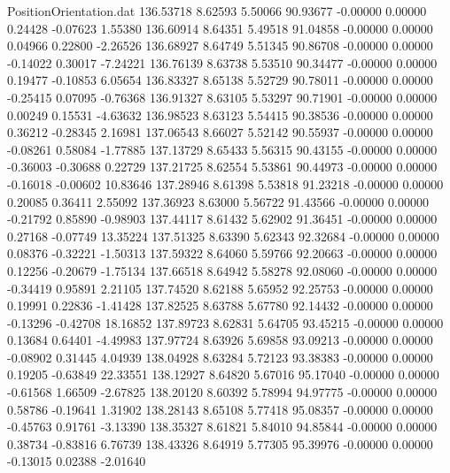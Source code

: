 \begin{filecontents}{PositionOrientation.dat}
 136.53718    8.62593    5.50066    90.93677   -0.00000    0.00000    0.24428   -0.07623    1.55380
 136.60914    8.64351    5.49518    91.04858   -0.00000    0.00000    0.04966    0.22800   -2.26526
 136.68927    8.64749    5.51345    90.86708   -0.00000    0.00000   -0.14022    0.30017   -7.24221
 136.76139    8.63738    5.53510    90.34477   -0.00000    0.00000    0.19477   -0.10853    6.05654
 136.83327    8.65138    5.52729    90.78011   -0.00000    0.00000   -0.25415    0.07095   -0.76368
 136.91327    8.63105    5.53297    90.71901   -0.00000    0.00000    0.00249    0.15531   -4.63632
 136.98523    8.63123    5.54415    90.38536   -0.00000    0.00000    0.36212   -0.28345    2.16981
 137.06543    8.66027    5.52142    90.55937   -0.00000    0.00000   -0.08261    0.58084   -1.77885
 137.13729    8.65433    5.56315    90.43155   -0.00000    0.00000   -0.36003   -0.30688    0.22729
 137.21725    8.62554    5.53861    90.44973   -0.00000    0.00000   -0.16018   -0.00602   10.83646
 137.28946    8.61398    5.53818    91.23218   -0.00000    0.00000    0.20085    0.36411    2.55092
 137.36923    8.63000    5.56722    91.43566   -0.00000    0.00000   -0.21792    0.85890   -0.98903
 137.44117    8.61432    5.62902    91.36451   -0.00000    0.00000    0.27168   -0.07749   13.35224
 137.51325    8.63390    5.62343    92.32684   -0.00000    0.00000    0.08376   -0.32221   -1.50313
 137.59322    8.64060    5.59766    92.20663   -0.00000    0.00000    0.12256   -0.20679   -1.75134
 137.66518    8.64942    5.58278    92.08060   -0.00000    0.00000   -0.34419    0.95891    2.21105
 137.74520    8.62188    5.65952    92.25753   -0.00000    0.00000    0.19991    0.22836   -1.41428
 137.82525    8.63788    5.67780    92.14432   -0.00000    0.00000   -0.13296   -0.42708   18.16852
 137.89723    8.62831    5.64705    93.45215   -0.00000    0.00000    0.13684    0.64401   -4.49983
 137.97724    8.63926    5.69858    93.09213   -0.00000    0.00000   -0.08902    0.31445    4.04939
 138.04928    8.63284    5.72123    93.38383   -0.00000    0.00000    0.19205   -0.63849   22.33551
 138.12927    8.64820    5.67016    95.17040   -0.00000    0.00000   -0.61568    1.66509   -2.67825
 138.20120    8.60392    5.78994    94.97775   -0.00000    0.00000    0.58786   -0.19641    1.31902
 138.28143    8.65108    5.77418    95.08357   -0.00000    0.00000   -0.45763    0.91761   -3.13390
 138.35327    8.61821    5.84010    94.85844   -0.00000    0.00000    0.38734   -0.83816    6.76739
 138.43326    8.64919    5.77305    95.39976   -0.00000    0.00000   -0.13015    0.02388   -2.01640

\end{filecontents}
